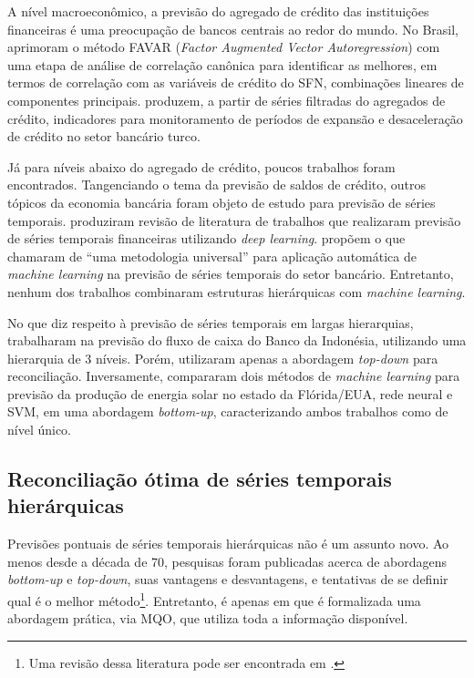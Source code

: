 \documentclass[
  12pt,
  twoside,
  openright,
  a4paper,
  chapter=TITLE,
  section=TITLE,
  brazil]{abntex2}
\begin{document}
A nível macroeconômico, a previsão do agregado de crédito das
instituições financeiras é uma preocupação de bancos centrais ao redor
do mundo. No Brasil, \textcite{bader_modelo_2014} aprimoram o método
FAVAR (\emph{Factor Augmented Vector Autoregression}) com uma etapa de
análise de correlação canônica para identificar as melhores, em termos
de correlação com as variáveis de crédito do SFN, combinações lineares
de componentes principais. \textcite{colak_tcmb_2019} produzem, a partir
de séries filtradas do agregados de crédito, indicadores para
monitoramento de períodos de expansão e desaceleração de crédito no
setor bancário turco.

Já para níveis abaixo do agregado de crédito, poucos trabalhos foram
encontrados. Tangenciando o tema da previsão de saldos de crédito,
outros tópicos da economia bancária foram objeto de estudo para previsão
de séries temporais. \textcite{sezer_financial_2019} produziram revisão
de literatura de trabalhos que realizaram previsão de séries temporais
financeiras utilizando \emph{deep learning}.
\textcite{gorodetskaya_machine_2021} propõem o que chamaram de ``uma
metodologia universal'' para aplicação automática de \emph{machine
learning} na previsão de séries temporais do setor bancário. Entretanto,
nenhum dos trabalhos combinaram estruturas hierárquicas com
\emph{machine learning}.

No que diz respeito à previsão de séries temporais em largas
hierarquias, \textcite{prayoga_top-down_2017} trabalharam na previsão do
fluxo de caixa do Banco da Indonésia, utilizando uma hierarquia de 3
níveis. Porém, utilizaram apenas a abordagem \emph{top-down} para
reconciliação. Inversamente, \textcite{li_hierarchical_2016} compararam
dois métodos de \emph{machine learning} para previsão da produção de
energia solar no estado da Flórida/EUA, rede neural e SVM, em uma
abordagem \emph{bottom-up}, caracterizando ambos trabalhos como de nível
único.

\subsection{Reconciliação ótima de séries temporais
hierárquicas}\label{reconciliauxe7uxe3o-uxf3tima-de-suxe9ries-temporais-hieruxe1rquicas}

Previsões pontuais de séries temporais hierárquicas não é um assunto
novo. Ao menos desde a década de 70, pesquisas foram publicadas acerca
de abordagens \emph{bottom-up} e \emph{top-down}, suas vantagens e
desvantagens, e tentativas de se definir qual é o melhor
método\footnote{Uma revisão dessa literatura pode ser encontrada em
  \textcite{athanasopoulos_hierarchical_2009}.}. Entretanto, é apenas em
\textcite{hyndman_optimal_2011} que é formalizada uma abordagem prática,
via MQO, que utiliza toda a informação disponível.
\end{document}
